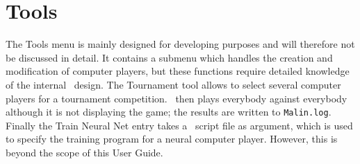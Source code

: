 \section{Tools}
The {\sf Tools} menu is mainly designed for developing purposes and will therefore not be discussed in detail. It contains a submenu which handles the creation and modification of computer players, but these functions require detailed knowledge of the internal \Malin\ design. The {\sf Tournament} tool allows to select several computer players for a tournament competition. \Malin\ then plays everybody against everybody although it is not displaying the game; the results are written to {\tt Malin.log}. Finally the {\sf Train Neural Net} entry takes a \Malin\ script file as argument, which is used to specify the training program for a neural computer player. However, this is beyond the scope of this User Guide.

